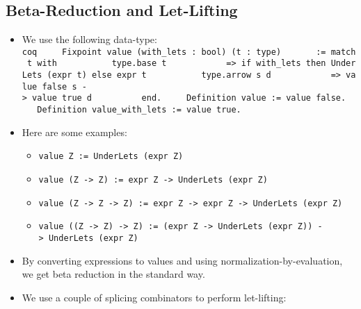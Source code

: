 \documentclass[
]{article}
\providecommand{\tightlist}{%
  \setlength{\itemsep}{0pt}\setlength{\parskip}{0pt}}
\begin{document}
\hypertarget{beta-reduction-and-let-lifting}{%
\subsection{Beta-Reduction and
Let-Lifting}\label{beta-reduction-and-let-lifting}}

\begin{itemize}
\item
  We use the following data-type:
  \texttt{coq\ \ \ \ \ Fixpoint\ value\textquotesingle{}\ (with\_lets\ :\ bool)\ (t\ :\ type)\ \ \ \ \ ~\ :=\ match\ t\ with\ \ \ \ \ ~\ ~\ ~\textbar{}\ type.base\ t\ \ \ \ \ ~\ ~\ ~\ ~=\textgreater{}\ if\ with\_lets\ then\ UnderLets\ (expr\ t)\ else\ expr\ t\ \ \ \ \ ~\ ~\ ~\textbar{}\ type.arrow\ s\ d\ \ \ \ \ ~\ ~\ ~\ ~=\textgreater{}\ value\textquotesingle{}\ false\ s\ -\textgreater{}\ value\textquotesingle{}\ true\ d\ \ \ \ \ ~\ ~\ ~end.\ \ \ \ \ Definition\ value\ :=\ value\textquotesingle{}\ false.\ \ \ \ \ Definition\ value\_with\_lets\ :=\ value\textquotesingle{}\ true.}
\item
  Here are some examples:

  \begin{itemize}
  \tightlist
  \item
    \texttt{value\ Z\ :=\ UnderLets\ (expr\ Z)}
  \item
    \texttt{value\ (Z\ -\textgreater{}\ Z)\ :=\ expr\ Z\ -\textgreater{}\ UnderLets\ (expr\ Z)}
  \item
    \texttt{value\ (Z\ -\textgreater{}\ Z\ -\textgreater{}\ Z)\ :=\ expr\ Z\ -\textgreater{}\ expr\ Z\ -\textgreater{}\ UnderLets\ (expr\ Z)}
  \item
    \texttt{value\ ((Z\ -\textgreater{}\ Z)\ -\textgreater{}\ Z)\ :=\ (expr\ Z\ -\textgreater{}\ UnderLets\ (expr\ Z))\ -\textgreater{}\ UnderLets\ (expr\ Z)}
  \end{itemize}
\item
  By converting expressions to values and using
  normalization-by-evaluation, we get beta reduction in the standard
  way.
\item
  We use a couple of splicing combinators to perform let-lifting:


\end{itemize}
\end{document}
